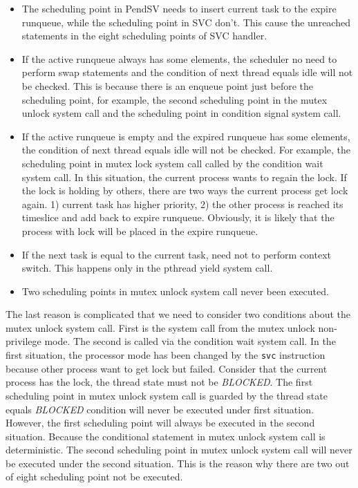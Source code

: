 \begin{itemize}
\item The scheduling point in PendSV needs to insert current task to the expire runqueue, while the scheduling point in SVC don't. This cause the unreached statements in the eight scheduling points of SVC handler.
\item If the active runqueue always has some elements, the scheduler no need to perform swap statements and the condition of next thread equals idle will not be checked. This is because there is an enqueue point just before the scheduling point, for example, the second scheduling point in the mutex unlock system call and the scheduling point in condition signal system call.
\item If the active runqueue is empty and the expired runqueue has some elements, the condition of next thread equals idle will not be checked. For example, the scheduling point in mutex lock system call called by the condition wait system call. In this situation, the current process wants to regain the lock. If the lock is holding by others, there are two ways the current process get lock again. 1) current task has higher priority, 2) the other process is reached its timeslice and add back to expire runqueue. Obviously, it is likely that the process with lock will be placed in the expire runqueue.
\item If the next task is equal to the current task, need not to perform context switch. This happens only in the pthread yield system call.
\item Two scheduling points in mutex unlock system call never been executed.
\end{itemize}

The last reason is complicated that we need to consider two conditions about the mutex unlock system call. First is the system call from the mutex unlock non-privilege mode. The second is called via the condition wait system call. In the first situation, the processor mode has been changed by the \texttt{svc} instruction because other process want to get lock but failed. Consider that the current process has the lock, the thread state must not be \textit{BLOCKED}. The first scheduling point in mutex unlock system call is guarded by the thread state equals \textit{BLOCKED} condition will never be executed under first situation. However, the first scheduling point will always be executed in the second situation. Because the conditional statement in mutex unlock system call is deterministic. The second scheduling point in mutex unlock system call will never be executed under the second situation. This is the reason why there are two out of eight scheduling point not be executed.

